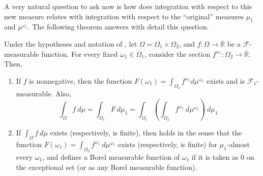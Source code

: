 A very natural question to ask now is how does integration with respect to this new measure relates with integration with respect to the ``original'' measures \(\mu_1\) and \(\mu^{\omega_1}\). The following theorem answers with detail this question.

\begin{thrm}\label{theorem:two-dim Fubini's}
    Under the hypotheses and notation of , let \(\Omega=\Omega_1\times\Omega_2\), and \(f\colon \Omega\to\overline{\mathbb{R}}\) be a \(\mathcal{F}\)-measurable function. For every fixed \(\omega_1\in\Omega_1\), consider the section \(f^{\omega_1}\colon\Omega_2\to\overline{\mathbb{R}}\). Then,
    \begin{enumerate}
        \item If \(f\) is nonnegative, then the function \(F(\omega_1)=\int_{\Omega_2}f^{\omega_1}d\mu^{\omega_1}\) exists and is \(\mathcal{F}_1\)-measurable. Also,
            \begin{equation}\label{equation:two-dim Fubini's}
                \int_{\Omega}f~d\mu=\int_{\Omega_1}F~d\mu_1=\int_{\Omega_1}\left(\int_{\Omega_2}f^{\omega_1}~d\mu^{\omega_1}\right)~d\mu_1
            \end{equation}
        \item If \(\int_{\Omega}f~d\mu\) exists (respectively, is finite), then  holds in the sense that the function \(F(\omega_1)=\int_{\Omega_2}f^{\omega_1}~d\mu^{\omega_1}\) exists (respectively, is finite) for \(\mu_1\)-almost every \(\omega_1\), and defines a Borel measurable function of \(\omega_1\) if it is taken as \(0\) on the exceptional set (or as any Borel measurable function).
    \end{enumerate}
\end{thrm}
